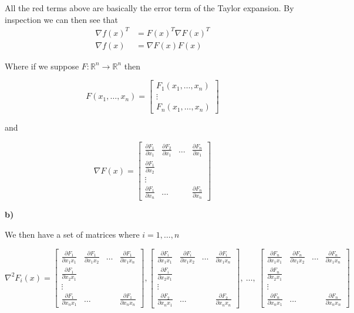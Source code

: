 All the red terms above are basically the error term of the Taylor expansion. By inspection we can then see that 
\begin{align*}
	\nabla f(x)^T &= F(x)^T\nabla F(x)^T \\
	\nabla f(x) &= \nabla F(x)F(x)
\end{align*}


Where if we suppose $F: \mathbb{R}^n \rightarrow \mathbb{R}^n$ then

\[
F(x_1, \ldots, x_n) =
\begin{bmatrix}
	F_1(x_1, \ldots, x_n) \\
	\vdots \\
	F_n(x_1, \ldots, x_n)
\end{bmatrix}
\]

and

\[
\nabla F(x) =
\begin{bmatrix}
	\frac{\partial F_1}{\partial x_1} & \frac{\partial F_2}{\partial x_1} & \ldots & \frac{\partial F_n}{\partial x_1} \\
	\frac{\partial F_1}{\partial x_2} & \\
	\vdots \\
	\frac{\partial F_1}{\partial x_n} & \ldots & & \frac{\partial F_n}{\partial x_n}
\end{bmatrix}
\]


\textbf{b)}

We then have a set of matrices where $i = 1, \ldots , n$

\[
\nabla^2 F_i(x) =
\begin{bmatrix}
\frac{\partial F_1}{\partial x_1 x_1} & \frac{\partial F_1}{\partial x_1 x_2} & \ldots & \frac{\partial F_1}{\partial x_1 x_n} \\
\frac{\partial F_1}{\partial x_2 x_1} & \\
\vdots \\
\frac{\partial F_1}{\partial x_n x_1} & \ldots & & \frac{\partial F_1}{\partial x_n x_n}
\end{bmatrix},
\begin{bmatrix}
\frac{\partial F_i}{\partial x_1 x_1} & \frac{\partial F_i}{\partial x_1 x_2} & \ldots & \frac{\partial F_i}{\partial x_1 x_n} \\
\frac{\partial F_i}{\partial x_2 x_1} & \\
\vdots \\
\frac{\partial F_2}{\partial x_n x_1} & \ldots & & \frac{\partial F_2}{\partial x_n x_n}
\end{bmatrix},\ \ldots,\
\begin{bmatrix}
\frac{\partial F_n}{\partial x_1 x_1} & \frac{\partial F_n}{\partial x_1 x_2} & \ldots & \frac{\partial F_n}{\partial x_1 x_n} \\
\frac{\partial F_n}{\partial x_2 x_1} & \\
\vdots \\
\frac{\partial F_n}{\partial x_n x_1} & \ldots & & \frac{\partial F_n}{\partial x_n x_n}
\end{bmatrix}
\]

